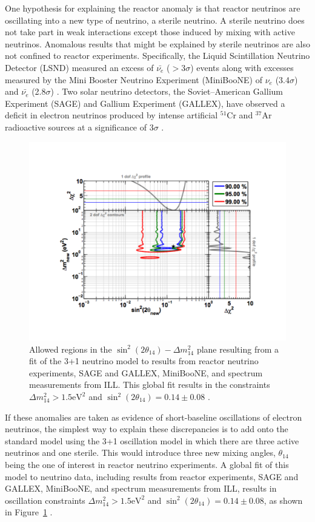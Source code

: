One hypothesis for explaining the reactor anomaly is that reactor neutrinos are oscillating into a new type of neutrino, a sterile neutrino. 
A sterile neutrino does not take part in weak interactions except those induced by mixing with active neutrinos.
Anomalous results that might be explained by sterile neutrinos are also not confined to reactor experiments.  
Specifically, the Liquid Scintillation Neutrino Detector (LSND)  measured an excess of $\bar{\nu_{e}}$ ($>$3$\sigma$) events \cite{Aguilar:2001ty} along with excesses measured by the Mini Booster Neutrino Experiment (MiniBooNE) of $\nu_{e}$ (3.4$\sigma$) and $\bar{\nu_{e}}$ (2.8$\sigma$) \cite{Aguilar-Arevalo:2013pmq}.
Two solar neutrino detectors, the Soviet–American Gallium Experiment (SAGE) and Gallium Experiment (GALLEX), have observed a deficit in electron neutrinos produced by intense artificial $^{51}$Cr and $^{37}$Ar radioactive sources at a significance of 3$\sigma$ \cite{Giunti:2010zu}.

\begin{figure}[!t]
	\centering
	\includegraphics[width=0.7\linewidth]{tex/3-reactorneutrinos-images/RAA_BestFitPoint}
	\caption{Allowed regions in the $\sin^2(2\theta_{14})-\Delta m^2_{14}$ plane resulting from a fit of the 3+1 neutrino model to results from reactor neutrino experiments, SAGE and GALLEX, MiniBooNE, and spectrum measurements from ILL. This global fit results in the constraints $\Delta m^2_{14} > 1.5 \textrm{eV}^2$ and $\sin^2(2\theta_{14}) = 0.14 \pm 0.08$ \cite{Mention:2011rk}.}
	\label{fig:raabestfitpoint}
\end{figure}

If these anomalies are taken as evidence of short-baseline oscillations of electron neutrinos, the simplest way to explain these discrepancies is to add onto the standard model using the 3+1 oscillation model in which there are three active neutrinos and one sterile. This would introduce three new mixing angles, $\theta_{14}$ being the one of interest in reactor neutrino experiments.
A global fit of this model to neutrino data, including results from reactor experiments, SAGE and GALLEX, MiniBooNE, and spectrum measurements from ILL, results in oscillation constraints $\Delta m^2_{14} > 1.5 \textrm{eV}^2$ and $\sin^2(2\theta_{14}) = 0.14 \pm 0.08$, as shown in Figure~\ref{fig:raabestfitpoint} \cite{Mention:2011rk}.


